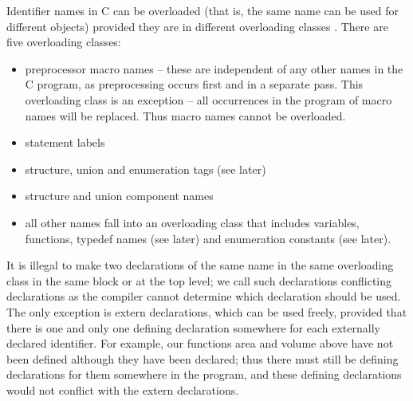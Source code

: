      Identifier names  in C  can be  {\kc overloaded\/} (that is, the
same name can be used for  different  objects)  provided  they  are 
in  different  {\kc overloading classes}
.  There are five overloading
classes:
\begin{itemize}
 \item {\kc preprocessor  macro names\/}  -- these  are independent
of any other names in the C program, as preprocessing occurs first
and in a separate pass. This overloading class is an exception  --
all  occurrences in the program of macro names will be replaced. Thus
macro names cannot be overloaded.

\item {\kc statement labels\/}

\item {\kc structure, union\/} and {\kc enumeration tags\/} (see later)

\item {\kc structure\/} and {\kc union component names\/}

\item all  {\kc other names\/}  fall into an overloading class that
includes variables, functions, {\cd typedef}  names (see  later) and 
enumeration constants  (see later).

\end{itemize}
     It is  illegal to  make two  declarations of  the same  name in 
the same overloading class  in the  same block  or at  the  top 
level;  we  call  such declarations {\kc conflicting  declarations\/}
as  the compiler cannot determine which declaration should be used.
The only exception is {\cd extern} declarations, which can  be used 
freely, provided  that there  is  one and only one defining 
declaration somewhere for each externally  declared identifier. For
example, our functions {\cd area} and  {\cd volume} above have not
been defined although they have been declared; thus there  must still
be defining declarations  for them somewhere in the program, and
these defining declarations would not conflict with the {\cd extern}
declarations.

